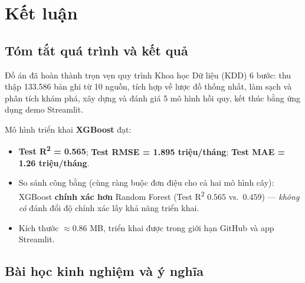 \section{Kết luận}
\label{sec:conclusion}

\subsection{Tóm tắt quá trình và kết quả}

Đồ án đã hoàn thành trọn vẹn quy trình Khoa học Dữ liệu (KDD) 6 bước:
thu thập 133.586 bản ghi từ 10 nguồn, tích hợp về lược đồ thống nhất,
làm sạch và phân tích khám phá, xây dựng và đánh giá 5 mô hình hồi quy,
kết thúc bằng ứng dụng demo Streamlit.

Mô hình triển khai \textbf{XGBoost} đạt:
\begin{itemize}[leftmargin=*, itemsep=2pt]
  \item \textbf{Test R\textsuperscript{2} = 0.565}; \textbf{Test RMSE = 1.895 triệu/tháng};
        \textbf{Test MAE = 1.26 triệu/tháng}.
  \item So sánh công bằng (cùng ràng buộc đơn điệu cho cả hai mô hình cây): XGBoost
        \textbf{chính xác hơn} Random Forest (Test R\textsuperscript{2} $0.565$ vs.\ $0.459$) —
        \textit{không có} đánh đổi độ chính xác lấy khả năng triển khai.
  \item Kích thước $\approx$0.86 MB, triển khai được trong giới hạn GitHub và app Streamlit.
\end{itemize}

\subsection{Bài học kinh nghiệm và ý nghĩa}


